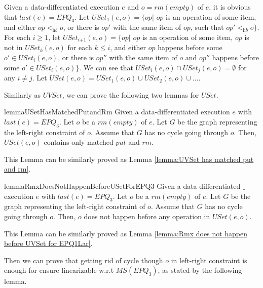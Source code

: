 Given a data-differentiated execution $e$ and $o = \textit{rm}(\textit{empty})$ of $e$, it is obvious that $\textit{last}(e) = \textit{EPQ}_3$. Let $\textit{USet}_1(e,o) = \{ \textit{op} \vert$ $\textit{op}$ is an operation of some item, and either $\textit{op} <_{\textit{hb}} o$, or there is $\textit{op}'$ with the same item of $\textit{op}$, such that $\textit{op}' <_{\textit{hb}} o \}$. For each $i \geq 1$, let $\textit{USet}_{\textit{i+1}}(e,o) = \{ \textit{op} \vert$ $\textit{op}$ is an operation of some item, $\textit{op}$ is not in $\textit{USet}_k(e,o)$ for each $k \leq i$, and either $\textit{op}$ happens before some $o' \in \textit{USet}_i(e,o)$, or there is $\textit{op}''$ with the same item of $o$ and $\textit{op}''$ happens before some $o' \in \textit{USet}_i(e,o) \}$. We can see that $\textit{USet}_i(e,o) \cap \textit{USet}_j(e,o) = \emptyset$ for any $i \neq j$. Let $\textit{USet}(e,o) = \textit{USet}_1(e,o) \cup \textit{USet}_2(e,o) \cup \ldots$.


Similarly as $\textit{UVSet}$, we can prove the following two lemmas for $\textit{USet}$.

\begin{restatable}{lemma}{USetHasMatchedPutandRm}
\label{lemma:USet has matched put and rm}
Given a data-differentiated execution $e$ with $\textit{last}(e) = \textit{EPQ}_3$. Let $o$ be a $\textit{rm}(\textit{empty})$ of $e$. Let $G$ be the graph representing the left-right constraint of $o$. Assume that $G$ has no cycle going through $o$. Then, $\textit{USet}(e,o)$ contains only matched $\textit{put}$ and $\textit{rm}$.
\end{restatable}

This Lemma can be similarly proved as Lemma \ref{lemma:UVSet has matched put and rm}.


\begin{restatable}{lemma}{RmxDoesNotHappenBeforeUSetForEPQ3}
\label{lemma:Rmx does not happen before USet for EPQ3}
Given a data-differentiated $\_$execution $e$ with $\textit{last}(e) = \textit{EPQ}_3$. Let $o$ be a $\textit{rm}(\textit{empty})$ of $e$. Let $G$ be the graph representing the left-right constraint of $o$. Assume that $G$ has no cycle going through $o$. Then, $o$ does not happen before any operation in $\textit{USet}(e,o)$.
\end{restatable}

This Lemma can be similarly proved as Lemma \ref{lemma:Rmx does not happen before UVSet for EPQ1Lar}.

Then we can prove that getting rid of cycle though $o$ in left-right constraint is enough for ensure linearizable w.r.t $\textit{MS}(\textit{EPQ}_3)$, as stated by the following lemma.


